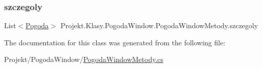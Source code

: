 \subsubsection{\texorpdfstring{szczegoly}{szczegoly}}
{\footnotesize\ttfamily List$<$\mbox{\hyperlink{class_projekt_1_1_baza_1_1_pogoda}{Pogoda}}$>$ Projekt.\+Klasy.\+Pogoda\+Window.\+Pogoda\+Window\+Metody.\+szczegoly}



The documentation for this class was generated from the following file\+:\begin{DoxyCompactItemize}
\item 
Projekt/\+Pogoda\+Window/\mbox{\hyperlink{_pogoda_window_metody_8cs}{Pogoda\+Window\+Metody.\+cs}}\end{DoxyCompactItemize}
